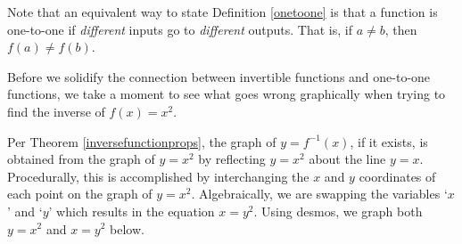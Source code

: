 \documentclass{ximera}
\begin{document}
Note that an equivalent way to state Definition \ref{onetoone} is that a function is one-to-one if \textit{different} inputs go to \textit{different} outputs. That is, if $a \neq b$, then $f(a) \neq f(b)$.

Before we solidify the connection between invertible functions and one-to-one functions, we take a moment to see what goes wrong graphically when trying to find the inverse of $f(x) = x^2$.

Per Theorem \ref{inversefunctionprops}, the graph of $y = f^{-1}(x)$, if it exists, is obtained from the graph of $y=x^2$  by reflecting $y=x^2$ about the line $y=x$.  Procedurally, this is accomplished by interchanging the $x$ and $y$ coordinates of each point on the graph of $y = x^2$.  Algebraically, we are swapping the variables `$x$' and `$y$' which results in the equation $x = y^2$.  Using desmos, we graph both $y=x^2$ and $x = y^2$ below.


 








\end{document}
